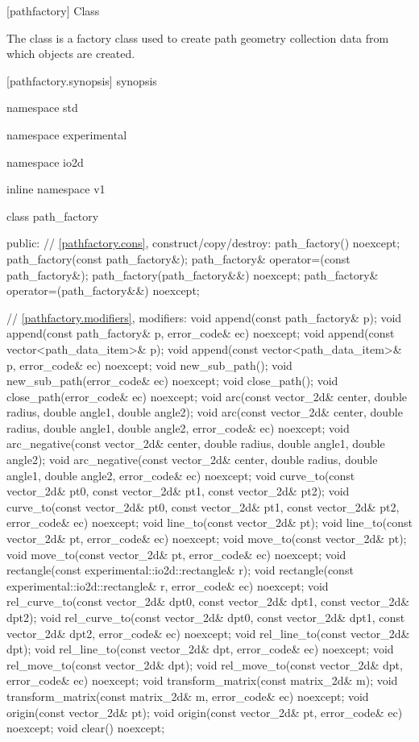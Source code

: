  [pathfactory] {Class }

\pnum
{}
The  class is a factory class used to create path geometry collection data from which  objects are created.

 [pathfactory.synopsis] { synopsis}

\begin{codeblock}
namespace std { namespace experimental { namespace io2d { inline namespace v1 {
  class path_factory {
  public:
    // \ref{pathfactory.cons}, construct/copy/destroy:
    path_factory() noexcept;
    path_factory(const path_factory&);
    path_factory& operator=(const path_factory&);
    path_factory(path_factory&&) noexcept;
    path_factory& operator=(path_factory&&) noexcept;
    
    // \ref{pathfactory.modifiers}, modifiers:
    void append(const path_factory& p);
    void append(const path_factory& p, error_code& ec) noexcept;
    void append(const vector<path_data_item>& p);
    void append(const vector<path_data_item>& p, error_code& ec) noexcept;
    void new_sub_path();
    void new_sub_path(error_code& ec) noexcept;
    void close_path();
    void close_path(error_code& ec) noexcept;
    void arc(const vector_2d& center, double radius, double angle1,
      double angle2);
    void arc(const vector_2d& center, double radius, double angle1,
      double angle2, error_code& ec) noexcept;
    void arc_negative(const vector_2d& center, double radius, double angle1,
      double angle2);
    void arc_negative(const vector_2d& center, double radius, double angle1,
      double angle2, error_code& ec) noexcept;
    void curve_to(const vector_2d& pt0, const vector_2d& pt1,
      const vector_2d& pt2);
    void curve_to(const vector_2d& pt0, const vector_2d& pt1,
      const vector_2d& pt2, error_code& ec) noexcept;
    void line_to(const vector_2d& pt);
    void line_to(const vector_2d& pt, error_code& ec) noexcept;
    void move_to(const vector_2d& pt);
    void move_to(const vector_2d& pt, error_code& ec) noexcept;
    void rectangle(const experimental::io2d::rectangle& r);
    void rectangle(const experimental::io2d::rectangle& r,
      error_code& ec) noexcept;
    void rel_curve_to(const vector_2d& dpt0, const vector_2d& dpt1,
      const vector_2d& dpt2);
    void rel_curve_to(const vector_2d& dpt0, const vector_2d& dpt1,
      const vector_2d& dpt2, error_code& ec) noexcept;
    void rel_line_to(const vector_2d& dpt);
    void rel_line_to(const vector_2d& dpt, error_code& ec) noexcept;
    void rel_move_to(const vector_2d& dpt);
    void rel_move_to(const vector_2d& dpt, error_code& ec) noexcept;
    void transform_matrix(const matrix_2d& m);
    void transform_matrix(const matrix_2d& m, error_code& ec) noexcept;
    void origin(const vector_2d& pt);
    void origin(const vector_2d& pt, error_code& ec) noexcept;
    void clear() noexcept;
    
}}}}}
\end{codeblock}
